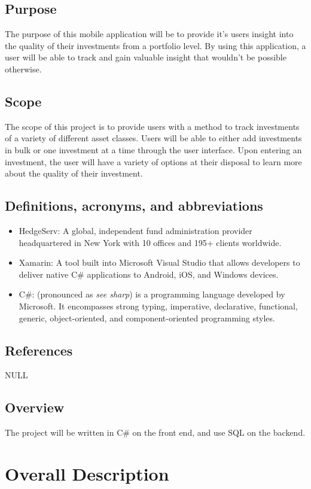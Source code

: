 \documentclass[onecolumn, draftclsnofoot,10pt, compsoc]{IEEEtran}
\begin{document}
\subsection{Purpose}
The purpose of this mobile application will be to provide it's users insight into the quality of their investments from a portfolio level. By using this application, a user will be able to track and gain valuable insight that wouldn't be possible otherwise.

\subsection{Scope}
The scope of this project is to provide users with a method to track investments of a variety of different asset classes. Users will be able to either add investments in bulk or one investment at a time through the user interface. Upon entering an investment, the user will have a variety of options at their disposal to learn more about the quality of their investment.

\subsection{Definitions, acronyms, and abbreviations}
\begin{itemize}
	\item HedgeServ: A global, independent fund administration provider headquartered in New York with
		10 offices and 195+ clients worldwide.
	\item Xamarin: A tool built into Microsoft Visual Studio that allows developers to deliver native 
	   	C# applications to Android, iOS, and Windows devices.
	\item C#: (pronounced as \textit{see sharp}) is a programming language developed by Microsoft. It encompasses strong typing, imperative, declarative, functional, generic,
		object-oriented, and component-oriented programming styles. 
\end{itemize}
\subsection{References}
NULL

\subsection{Overview}
The project will be written in C\# on the front end, and use SQL on the backend. 


\section{Overall Description}
\end{document}
